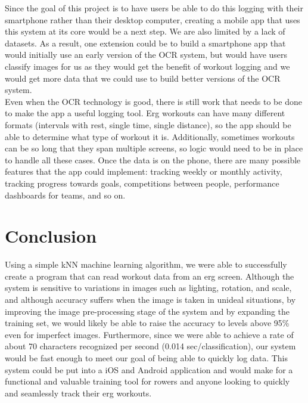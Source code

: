 \documentclass[a4paper,12pt]{article}
\begin{document}
Since the goal of this project is to have users be able to do this logging with their smartphone rather than their desktop computer, creating a mobile app that uses this system at its core would be a next step. We are also limited by a lack of datasets. As a result, one extension could be to build a smartphone app that would initially use an early version of the OCR system, but would have users classify images for us as they would get the benefit of workout logging and we would get more data that we could use to build better versions of the OCR system. \\


Even when the OCR technology is good, there is still work that needs to be done to make the app a useful logging tool. Erg workouts can have many different formats (intervals with rest, single time, single distance), so the app should be able to determine what type of workout it is. Additionally, sometimes workouts can be so long that they span multiple screens, so logic would need to be in place to handle all these cases. Once the data is on the phone, there are many possible features that the app could implement: tracking weekly or monthly activity, tracking progress towards goals, competitions between people, performance dashboards for teams, and so on.


\section{Conclusion}
Using a simple kNN machine learning algorithm, we were able to successfully create a program that can read workout data from an erg screen. Although the system is sensitive to variations in images such as lighting, rotation, and scale, and although accuracy suffers when the image is taken in unideal situations, by improving the image pre-processing stage of the system and by expanding the training set, we would likely be able to raise the accuracy to levels above 95\% even for imperfect images. Furthermore, since we were able to achieve a rate of about 70 characters recognized per second (0.014 sec/classification), our system would be fast enough to meet our goal of being able to quickly log data. This system could be put into a iOS and Android application and would make for a functional and valuable training tool for rowers and anyone looking to quickly and seamlessly track their erg workouts.




\appendix
\end{document}
